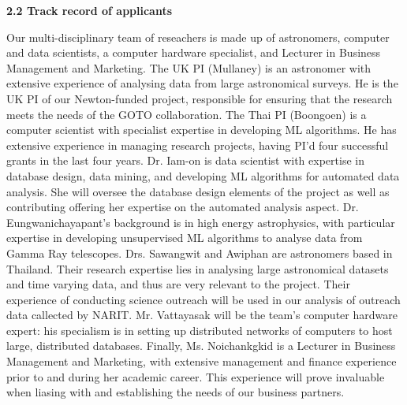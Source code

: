\documentclass[11pt]{article}
\begin{document}
\vspace{3mm}
\noindent
{\large \bf 2.2 Track record of applicants}

\noindent
Our multi-disciplinary team of reseachers is made up of astronomers, computer and data scientists, a computer hardware specialist, and Lecturer in Business Management and Marketing. The UK PI (Mullaney) is an astronomer with extensive experience of analysing data from large astronomical surveys. He is the UK PI of our Newton-funded project, responsible for ensuring that the research meets the needs of the GOTO collaboration. The Thai PI (Boongoen) is a computer scientist with specialist expertise in developing ML algorithms. He has extensive experience in managing research projects, having PI'd four successful grants in the last four years. Dr. Iam-on is data scientist with expertise in database design, data mining, and developing ML algorithms for automated data analysis. She will oversee the database design elements of the project as well as contributing offering her expertise on the automated analysis aspect. Dr. Eungwanichayapant's background is in high energy astrophysics, with particular expertise in developing unsupervised ML algorithms to analyse data from Gamma Ray telescopes. Drs. Sawangwit and Awiphan are astronomers based in Thailand. Their research expertise lies in analysing large astronomical datasets and time varying data, and thus are very relevant to the project. Their experience of conducting science outreach will be used in our analysis of outreach data callected by NARIT. Mr. Vattayasak will be the team's computer hardware expert: his specialism is in setting up distributed networks of computers to host large, distributed databases. Finally, Ms. Noichankgkid is a Lecturer in Business Management and Marketing, with extensive management and finance experience prior to and during her academic career. This experience will prove invaluable when liasing with and establishing the needs of our business partners. 
\end{document}
